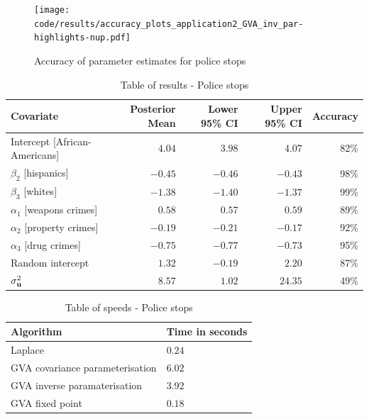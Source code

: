 \begin{figure}[h]
\texttt{[image: code/results/accuracy\_plots\_application2\_GVA\_inv\_par-highlights-nup.pdf]}
\caption{Accuracy of parameter estimates for police stops}
\label{fig:police_stops}
\end{figure}

\begin{table}
	\begin{tabular}{|l|rrrr|}
		\hline
		Covariate                     & Posterior Mean & Lower 95\% CI & Upper 95\% CI & Accuracy \\
		\hline
		Intercept [African-Americans] & $4.04$          & $3.98$           & $4.07$          & 82\%   \\
		$\beta_2$ [hispanics]         & $-0.45$         & $-0.46$          & $-0.43$         & 98\%   \\
		$\beta_3$ [whites]            & $-1.38$         & $-1.40$          & $-1.37$         & 99\%   \\
		$\alpha_1$ [weapons crimes]   & $0.58$          & $0.57$           & $0.59$          & 89\%   \\
		$\alpha_2$ [property crimes]  & $-0.19$         & $-0.21$          & $-0.17$         & 92\%   \\
		$\alpha_3$ [drug crimes]      & $-0.75$        & $-0.77$          & $-0.73$         & 95\%   \\
		Random intercept              & $1.32$         & $-0.19$         & $2.20$         & 87\%   \\
		$\sigma^2_{{\bf u}}$              & $8.57$          & $1.02$           & $24.35$         & 49\%     \\
		\hline
	\end{tabular}
	\caption{Table of results - Police stops}
	\label{tab:application_police_stops}
\end{table}

\begin{table}
	\begin{tabular}{|ll|}
		\hline
		Algorithm & Time  in seconds \\
		\hline
		Laplace & $0.24$ \\
		GVA covariance parameterisation & $6.02$ \\
		GVA inverse paramaterisation & $3.92$ \\
		GVA fixed point & $0.18$ \\
		\hline
	\end{tabular}
	\caption{Table of speeds - Police stops}
	\label{tab:police_stop_speeds}
\end{table}

